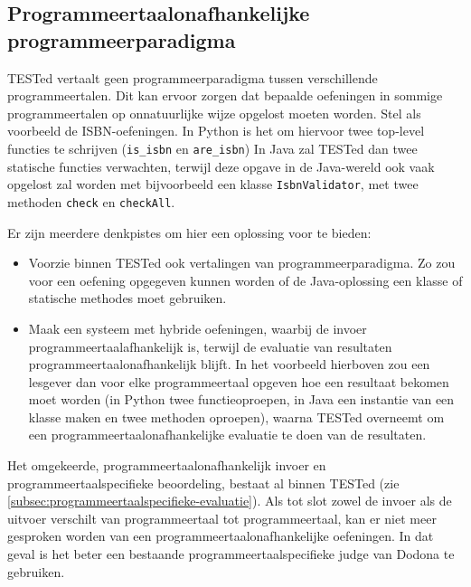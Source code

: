 \subsection{Programmeertaalonafhankelijke programmeerparadigma}\label{subsec:programmeertaalonafhankelijke-programmeerparadigma}

TESTed vertaalt geen programmeerparadigma tussen verschillende programmeertalen.
Dit kan ervoor zorgen dat bepaalde oefeningen in sommige programmeertalen op onnatuurlijke wijze opgelost moeten worden.
Stel als voorbeeld de ISBN-oefeningen.
In Python is het  om hiervoor twee top-level functies te schrijven (\texttt{is\_isbn} en \texttt{are\_isbn})
In Java zal TESTed dan twee statische functies verwachten, terwijl deze opgave in de Java-wereld ook vaak opgelost zal worden met bijvoorbeeld een klasse \texttt{IsbnValidator}, met twee methoden \texttt{check} en \texttt{checkAll}.

Er zijn meerdere denkpistes om hier een oplossing voor te bieden:

\begin{itemize}
    \item Voorzie binnen TESTed ook vertalingen van programmeerparadigma.
    Zo zou voor een oefening opgegeven kunnen worden of de Java-oplossing een klasse of statische methodes moet gebruiken.
    \item Maak een systeem met hybride oefeningen, waarbij de invoer programmeertaalafhankelijk is, terwijl de evaluatie van resultaten programmeertaalonafhankelijk blijft.
    In het voorbeeld hierboven zou een lesgever dan voor elke programmeertaal opgeven hoe een resultaat bekomen moet worden (in Python twee functieoproepen, in Java een instantie van een klasse maken en twee methoden oproepen), waarna TESTed overneemt om een programmeertaalonafhankelijke evaluatie te doen van de resultaten.
\end{itemize}

Het omgekeerde, programmeertaalonafhankelijk invoer en programmeertaalspecifieke beoordeling, bestaat al binnen TESTed (zie \cref{subsec:programmeertaalspecifieke-evaluatie}).
Als tot slot zowel de invoer als de uitvoer verschilt van programmeertaal tot programmeertaal, kan er niet meer gesproken worden van een programmeertaalonafhankelijke oefeningen.
In dat geval is het beter een bestaande programmeertaalspecifieke judge van Dodona te gebruiken.
